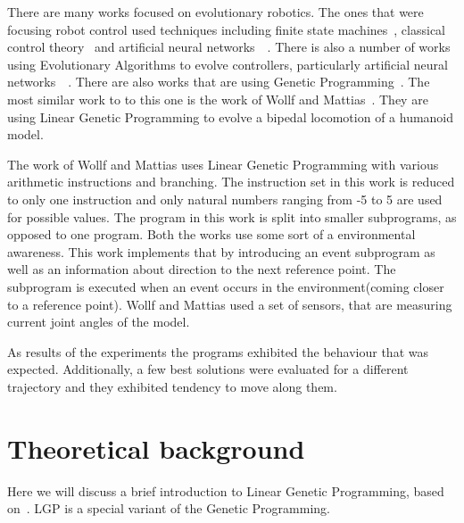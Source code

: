 \documentclass{ExcelAtFIT}
\begin{document}

There are many works focused on evolutionary robotics.
The ones that were focusing robot control used techniques including finite state machines~\cite{Hodgins1996}, classical control theory~\cite{Mita1984} and artificial neural networks~\cite{Reil2002}~\cite{Lewis1996}.
There is also a number of works using Evolutionary Algorithms to evolve controllers, particularly artificial neural networks~\cite{Randall1992}~\cite{Farooq2013}.
There are also works that are using Genetic Programming~\cite{Macedo2017}.
The most similar work to to this one is the work of Wollf and Mattias~\cite{Wolff2007}.
They are using Linear Genetic Programming to evolve a bipedal locomotion of a humanoid model.

The work of Wollf and Mattias uses Linear Genetic Programming with various arithmetic instructions and branching.
The instruction set in this work is reduced to only one instruction and only natural numbers ranging from -5 to 5 are used for possible values.
The program in this work is split into smaller subprograms, as opposed to one program.
Both the works use some sort of a environmental awareness.
This work implements that by introducing an event subprogram as well as an information about direction to the next reference point.
The subprogram is executed when an event occurs in the environment(coming closer to a reference point).
Wollf and Mattias used a set of sensors, that are measuring current joint angles of the model.

As results of the experiments the programs exhibited the behaviour that was expected.
Additionally, a few best solutions were evaluated for a different trajectory and they exhibited tendency to move along them.

\section{Theoretical background}
\label{sec:theory}
Here we will discuss a brief introduction to Linear Genetic Programming, based on~\cite{Brameier2010}.
LGP is a special variant of the Genetic Programming.
\end{document}

